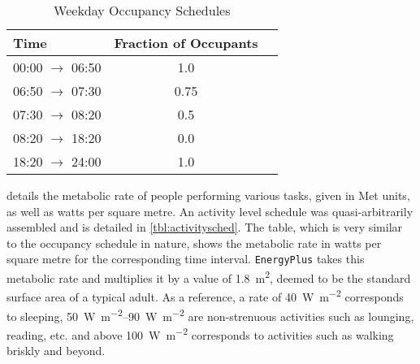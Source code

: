 \begin{table}[htb]
    \centering
    \caption{Weekday Occupancy Schedules}
    \label{tbl:occupancysched}
    \begin{tabular}
        {lcr}
        \toprule
        Time & Fraction of Occupants \\
        \midrule
        \num[parse-numbers=false]{00}:\num[parse-numbers=false]{00} $\rightarrow$ \num[parse-numbers=false]{06}:\num[parse-numbers=false]{50} & \num{1.0}\\
        \num[parse-numbers=false]{06}:\num[parse-numbers=false]{50} $\rightarrow$ \num[parse-numbers=false]{07}:\num[parse-numbers=false]{30} & \num{0.75}\\
        \num[parse-numbers=false]{07}:\num[parse-numbers=false]{30} $\rightarrow$ \num[parse-numbers=false]{08}:\num[parse-numbers=false]{20} & \num{0.5}\\
        \num[parse-numbers=false]{08}:\num[parse-numbers=false]{20} $\rightarrow$ \num[parse-numbers=false]{18}:\num[parse-numbers=false]{20} & \num{0.0}\\
        \num[parse-numbers=false]{18}:\num[parse-numbers=false]{20} $\rightarrow$ \num[parse-numbers=false]{24}:\num[parse-numbers=false]{00} & \num{1.0}\\
        \bottomrule
    \end{tabular}
\end{table}

 \cite{ashrae_ansiashrae_2010} details the metabolic rate of people performing various tasks, given in Met units, as well as watts per square metre. An activity level schedule was quasi-arbitrarily assembled and is detailed in \cref{tbl:activitysched}. The table, which is very similar to the occupancy schedule in nature, shows the metabolic rate in watts per square metre for the corresponding time interval. \texttt{EnergyPlus} takes this metabolic rate and multiplies it by a value of \qty{1.8}{\square\meter}, deemed to be the standard surface area of a typical adult. As a reference, a rate of \qty{40}{\watt\per\square\meter} corresponds to sleeping, \qtyrange{50}{90}{\watt\per\square\meter} are non-strenuous activities such as lounging, reading, etc. and above \qty{100}{\watt\per\square\meter} corresponds to activities such as walking briskly and beyond.
 
